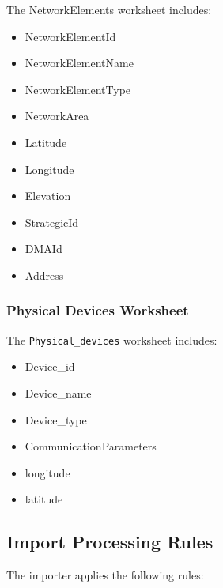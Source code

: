 \documentclass[11pt,a4paper]{article}
\begin{document}
The NetworkElements worksheet includes:

\begin{itemize}
    \item NetworkElementId
    \item NetworkElementName
    \item NetworkElementType
    \item NetworkArea
    \item Latitude
    \item Longitude
    \item Elevation
    \item StrategicId
    \item DMAId
    \item Address
\end{itemize}

\subsubsection{Physical Devices Worksheet}

The \texttt{Physical\_devices} worksheet includes:

\begin{itemize}
    \item Device\_id
    \item Device\_name
    \item Device\_type
    \item CommunicationParameters
    \item longitude
    \item latitude
\end{itemize}

\subsection{Import Processing Rules}

The importer applies the following rules:
\end{document}
